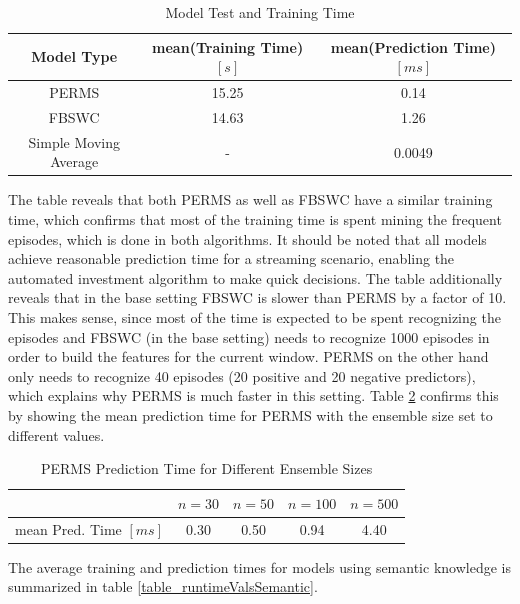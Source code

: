 \begin{table}
\vspace{0.5cm}	
\caption[Algorithm Runtime Performance]{Model Test and Training Time \label{table_runtimeVals}}
\centering
\begin{tabular}{ c | c | c}		
  Model Type & mean(Training Time) $[s]$ & mean(Prediction Time) $[ms]$ \\
  \hline
  PERMS & 15.25 & 0.14\\
  FBSWC & 14.63 & 1.26\\
  Simple Moving Average & - & 0.0049\\
\end{tabular}
\vspace{0.5cm}
\end{table}

The table reveals that both PERMS as well as FBSWC have a similar training time, which confirms that most of the training time is spent mining the frequent episodes, which is done in both algorithms. It should be noted that all models achieve reasonable prediction time for a streaming scenario, enabling the automated investment algorithm to make quick decisions. The table additionally reveals that in the base setting FBSWC is slower than PERMS by a factor of 10. This makes sense, since most of the time is expected to be spent recognizing the episodes and FBSWC (in the base setting) needs to recognize 1000 episodes in order to build the features for the current window. PERMS on the other hand only needs to recognize 40 episodes (20 positive and 20 negative predictors), which explains why PERMS is much faster in this setting. Table \ref{table_runtimeValsEnsembleSize} confirms this by showing the mean prediction time for PERMS with the ensemble size set to different values.

\begin{table}
\vspace{0.5cm}
\caption[PERMS Runtime Performance]{PERMS Prediction Time for Different Ensemble Sizes  \label{table_runtimeValsEnsembleSize}}
\centering
\begin{tabular}{ c | c | c | c | c}		
   & $n=30$ & $n=50$ & $n=100$ & $n=500$\\
  \hline
  mean Pred. Time $[ms]$ & 0.30 & 0.50 & 0.94 & 4.40\\
\end{tabular}
\vspace{0.5cm}
\end{table}

The average training and prediction times for models using semantic knowledge is summarized in table \ref{table_runtimeValsSemantic}.

